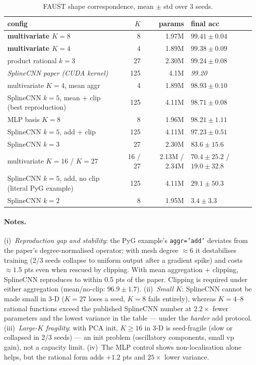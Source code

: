 \documentclass[11pt]{article}
\newcommand{\code}[1]{\texttt{#1}}
\begin{document}
\begin{table}[ht]
\centering
\footnotesize
\setlength{\tabcolsep}{4pt}
\begin{tabular}{lrrl}
\toprule
config & $K$ & params & final acc \\
\midrule
\textbf{multivariate $K{=}8$} & 8 & 1.97M & $\mathbf{99.41 \pm 0.04}$ \\
\textbf{multivariate $K{=}4$} & 4 & 1.89M & $\mathbf{99.38 \pm 0.09}$ \\
product rational $k{=}3$ & 27 & 2.30M & $99.24 \pm 0.08$ \\
\emph{SplineCNN paper (CUDA kernel)} & 125 & 4.1M & \emph{99.20} \\
multivariate $K{=}4$, mean aggr & 4 & 1.89M & $98.93 \pm 0.10$ \\
SplineCNN $k{=}5$, mean $+$ clip (best reproduction) & 125 & 4.11M & $98.71 \pm 0.08$ \\
MLP basis $K{=}8$ & 8 & 1.96M & $98.21 \pm 1.11$ \\
SplineCNN $k{=}5$, add $+$ clip & 125 & 4.11M & $97.23 \pm 0.51$ \\
SplineCNN $k{=}3$ & 27 & 2.30M & $83.6 \pm 15.6$ \\
multivariate $K{=}16$ / $K{=}27$ & 16 / 27 & 2.13M / 2.34M & $70.4 \pm 25.2$ / $19.0 \pm 32.8$ \\
SplineCNN $k{=}5$, add, no clip (literal PyG example) & 125 & 4.11M & $29.1 \pm 50.3$ \\
SplineCNN $k{=}2$ & 8 & 1.95M & $3.4 \pm 3.3$ \\
\bottomrule
\end{tabular}
\caption{FAUST shape correspondence, mean $\pm$ std over 3 seeds.}
\label{tab:faust}
\end{table}

\paragraph{Notes.} (i)~\emph{Reproduction gap and stability}: the PyG
example's \code{aggr='add'} deviates from the paper's degree-normalised
operator; with mesh degree $\approx 6$ it destabilises training (2/3 seeds
collapse to uniform output after a gradient spike) and costs $\approx 1.5$
pts even when rescued by clipping. With mean aggregation $+$ clipping,
SplineCNN reproduces to within 0.5 pts of the paper. Clipping is required
under either aggregation (mean/no-clip: $96.9 \pm 1.7$).
(ii)~\emph{Small $K$}: SplineCNN cannot be made small in 3-D ($K{=}27$ loses
a seed, $K{=}8$ fails entirely), whereas $K{=}4$--$8$ rational functions
exceed the published SplineCNN number at $2.2\times$ fewer parameters and
the lowest variance in the table --- under the \emph{harder} add protocol.
(iii)~\emph{Large-$K$ fragility}: with PCA init, $K\ge16$ in 3-D is
seed-fragile (slow or collapsed in 2/3 seeds) --- an init problem
(oscillatory components, small vp gain), not a capacity limit. (iv)~The MLP
control shows non-localisation alone helps, but the rational form adds
$+1.2$ pts and $25\times$ lower variance.
\end{document}
